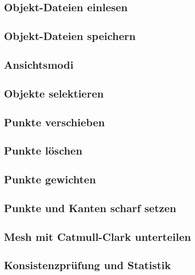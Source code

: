 \subsection{Objekt-Dateien einlesen}
\subsection{Objekt-Dateien speichern}
\subsection{Ansichtsmodi}
\subsection{Objekte selektieren}
\subsection{Punkte verschieben}
\subsection{Punkte löschen}
\subsection{Punkte gewichten}
\subsection{Punkte und Kanten scharf setzen}
\subsection{Mesh mit Catmull-Clark unterteilen}
\subsection{Konsistenzprüfung und Statistik}